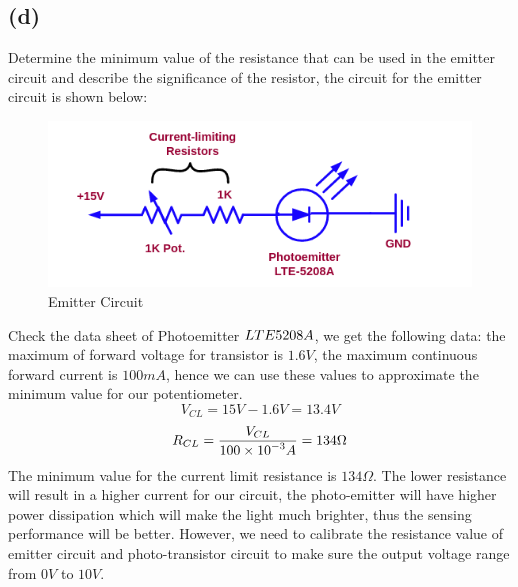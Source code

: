 \documentclass[letterpaper]{article}
\begin{document}
\subsection*{(d)}
Determine the minimum value of the resistance that can be used in the emitter circuit and describe the significance of the resistor, the circuit for the emitter circuit is shown below:
\begin{figure}[H]
	\centering
	\includegraphics[scale=0.8]{emitter_circuit.png}
	\caption{Emitter Circuit}
	\label{fig:emiter_circuit}
\end{figure}
Check the data sheet of Photoemitter $LTE\-5208A$, we get the following data: the maximum of forward voltage for transistor is $1.6 V$, the maximum continuous forward current is $100mA$, hence we can use these values to approximate the minimum value for our potentiometer.
$$V_{CL} = 15V - 1.6V = 13.4V$$
$$R_{CL} = \frac{\displaystyle V_{CL}}{\displaystyle 100\times10^{-3}A} = 134\Omega$$
The minimum value for the current limit resistance is $134\Omega$. The lower resistance will result in a higher current for our circuit, the photo-emitter will have higher power dissipation which will make the light much brighter, thus the sensing performance will be better. However, we need to calibrate the resistance value of emitter circuit and photo-transistor circuit to make sure the output voltage range from $0 V$ to $10 V$.
\end{document}
